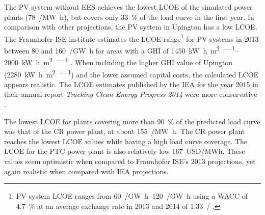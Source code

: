 The PV system without EES achieves the lowest LCOE of the simulated power plants (\SI{78}{\usd/\mega\watt\hour}), but covers only \SI{33}{\percent} of the load curve in the first year. In comparison with other projections, the PV system in Upington has a low LCOE. The Fraunhofer ISE institute estimates the LCOE range\footnote{PV system LCOE ranges from \SIrange{60}{120}{\eur/\giga\watt\hour} using a WACC of \SI{4.7}{\percent} \cite{FraunhoferISE2013} at an average exchange rate in 2013 and 2014 of \SI{1.33}{\usd/\eur} \cite{StatistaGmbH2015}.} for PV systems in 2013 between \num{80} and \SI{160}{\usd/\giga\watt\hour} for areas with a GHI of \SIrange{1450}{2000}{\kilo\watt\hour\per\square\metre\per\year} \cite{FraunhoferISE2013}. When including the higher GHI value of Upington (\SI{2280}{\kilo\watt\hour\per\square\metre\per\year}) and the lower assumed capital costs, the calculated LCOE appears realistic. The LCOE estimates published by the IEA for the year 2015 in their annual report \emph{Tracking Clean Energy Progress 2014} were more conservative \cite{IEA2014c}.


The lowest LCOE for plants covering more than \SI{90}{\percent} of the predicted load curve was that of the CR power plant, at about \SI{155}{\usd/\mega\watt\hour}. The CR power plant reaches the lowest LCOE values while having a high load curve coverage. The LCOE for the PTC power plant is also relatively low \SI{167}{USD/MWh}. These values seem optimistic when compared to Fraunhofer ISE's 2013 projections, yet again realistic when compared with IEA projections.

